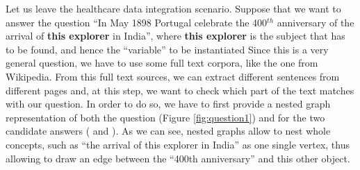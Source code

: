 \begin{example}\label{ex:nestalign}
	Let us leave the healthcare data integration scenario. Suppose that we want to answer the question ``In May 1898 Portugal celebrate the 400$^{th}$ anniversary of the arrival of \textbf{this explorer} in India'', where \textbf{this explorer} is the subject that has to be found, and hence the ``variable'' to be instantiated Since this is a very general question, we have to use some full text corpora, like the one from Wikipedia. From this full text sources, we can extract different sentences from different pages and, at this step, we want to check which part of the text matches with our question. In order to do so, we have to first provide a nested graph representation of both the question (Figure \vref{fig:question1}) and for the two candidate answers ( and ). As we can see, nested graphs allow to nest whole concepts, such as ``the arrival of this explorer in India'' as one single vertex, thus allowing to draw an edge between the ``400th anniversary'' and this other object.
	

\end{example}
